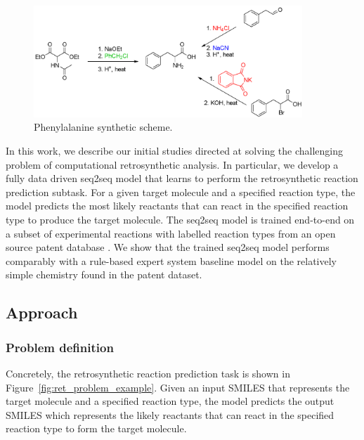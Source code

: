 \begin{figure}
  \centering
  \includegraphics[width=0.9\textwidth]{Images/phenylalanine_synth.png}
  \caption{Phenylalanine synthetic scheme.}
  \label{fig:phenyl}
\end{figure}

In this work, we describe our initial studies directed at solving the challenging problem of computational retrosynthetic analysis. In particular, we develop a fully data driven seq2seq model that learns to perform the retrosynthetic reaction prediction subtask. For a given target molecule and a specified reaction type, the model predicts the most likely reactants that can react in the specified reaction type to produce the target molecule. The seq2seq model is trained end-to-end on a subset of experimental reactions with labelled reaction types \cite{schneider2016s} from an open source patent database \cite{lowe2012extraction}. We show that the trained seq2seq model performs comparably with a rule-based expert system baseline model on the relatively simple chemistry found in the patent dataset. 

\subsection{Approach}

\subsubsection{Problem definition}
Concretely, the retrosynthetic reaction prediction task is shown in Figure~\ref{fig:ret_problem_example}. Given an input SMILES that represents the target molecule and a specified reaction type, the model predicts the output SMILES which represents the likely reactants that can react in the specified reaction type to form the target molecule. 


